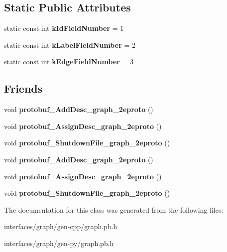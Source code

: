\subsection*{Static Public Attributes}
\begin{DoxyCompactItemize}
\item 
\hypertarget{classgraph_1_1Graph__Node_a64bb5b3869f25b9090ab28bb9a36771c}{
static const int {\bfseries kIdFieldNumber} = 1}
\label{classgraph_1_1Graph__Node_a64bb5b3869f25b9090ab28bb9a36771c}

\item 
\hypertarget{classgraph_1_1Graph__Node_ad7acd0364613fb8c7705b73c4501f1a2}{
static const int {\bfseries kLabelFieldNumber} = 2}
\label{classgraph_1_1Graph__Node_ad7acd0364613fb8c7705b73c4501f1a2}

\item 
\hypertarget{classgraph_1_1Graph__Node_a4e420c8292b17a5c36c317485d324025}{
static const int {\bfseries kEdgeFieldNumber} = 3}
\label{classgraph_1_1Graph__Node_a4e420c8292b17a5c36c317485d324025}

\end{DoxyCompactItemize}
\subsection*{Friends}
\begin{DoxyCompactItemize}
\item 
\hypertarget{classgraph_1_1Graph__Node_a3216c708da10839178deebea43d6f0be}{
void {\bfseries protobuf\_\-AddDesc\_\-graph\_\-2eproto} ()}
\label{classgraph_1_1Graph__Node_a3216c708da10839178deebea43d6f0be}

\item 
\hypertarget{classgraph_1_1Graph__Node_a4c9d7eb8f9e30e490c8bcae70e629de5}{
void {\bfseries protobuf\_\-AssignDesc\_\-graph\_\-2eproto} ()}
\label{classgraph_1_1Graph__Node_a4c9d7eb8f9e30e490c8bcae70e629de5}

\item 
\hypertarget{classgraph_1_1Graph__Node_aac10332314561225d8ac09b797223f3d}{
void {\bfseries protobuf\_\-ShutdownFile\_\-graph\_\-2eproto} ()}
\label{classgraph_1_1Graph__Node_aac10332314561225d8ac09b797223f3d}

\item 
\hypertarget{classgraph_1_1Graph__Node_a3216c708da10839178deebea43d6f0be}{
void {\bfseries protobuf\_\-AddDesc\_\-graph\_\-2eproto} ()}
\label{classgraph_1_1Graph__Node_a3216c708da10839178deebea43d6f0be}

\item 
\hypertarget{classgraph_1_1Graph__Node_a4c9d7eb8f9e30e490c8bcae70e629de5}{
void {\bfseries protobuf\_\-AssignDesc\_\-graph\_\-2eproto} ()}
\label{classgraph_1_1Graph__Node_a4c9d7eb8f9e30e490c8bcae70e629de5}

\item 
\hypertarget{classgraph_1_1Graph__Node_aac10332314561225d8ac09b797223f3d}{
void {\bfseries protobuf\_\-ShutdownFile\_\-graph\_\-2eproto} ()}
\label{classgraph_1_1Graph__Node_aac10332314561225d8ac09b797223f3d}

\end{DoxyCompactItemize}


The documentation for this class was generated from the following files:\begin{DoxyCompactItemize}
\item 
interfaces/graph/gen-\/cpp/graph.pb.h\item 
interfaces/graph/gen-\/py/graph.pb.h\end{DoxyCompactItemize}
